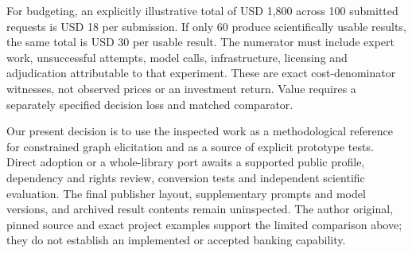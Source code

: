 For budgeting, an explicitly illustrative total of USD 1,800 across 100
submitted requests is USD 18 per submission. If only 60 produce scientifically
usable results, the same total is USD 30 per usable result. The numerator
must include expert work, unsuccessful attempts, model calls, infrastructure,
licensing and adjudication attributable to that experiment. These are exact
cost-denominator witnesses, not observed prices or an investment return.
Value requires a separately specified decision loss and matched comparator.
\citep{exec24_ecmo_reference}

Our present decision is to use the inspected work as a methodological reference
for constrained graph elicitation and as a source of explicit prototype tests.
Direct adoption or a whole-library port awaits a supported public profile,
dependency and rights review, conversion tests and independent scientific
evaluation. The final publisher layout, supplementary prompts and model
versions, and archived result contents remain uninspected. The author
original, pinned source and exact project examples support the limited
comparison above; they do not establish an implemented or accepted banking
capability.\citep{exec24_ecmo_original,exec24_ecmo_code,exec24_ecmo_reference}
